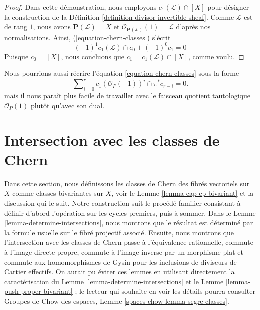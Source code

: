 \begin{proof}
Dans cette démonstration, nous employons $c_1(\mathcal{L}) \cap [X]$ pour désigner la
construction de la Définition \ref{definition-divisor-invertible-sheaf}.
Comme $\mathcal{L}$ est de rang $1$, nous avons
$\mathbf{P}(\mathcal{L}) = X$ et
$\mathcal{O}_{\mathbf{P}(\mathcal{L})}(1) = \mathcal{L}$
d'après nos normalisations. Ainsi, (\ref{equation-chern-classes})
s'écrit
$$
(-1)^1 c_1(\mathcal{L}) \cap c_0 + (-1)^0 c_1 = 0
$$
Puisque $c_0 = [X]$, nous concluons que $c_1 = c_1(\mathcal{L}) \cap [X]$,
comme voulu.
\end{proof}

\begin{remark}
\label{remark-equation-signs}
Nous pourrions aussi récrire l'équation \ref{equation-chern-classes} sous la forme
\begin{equation}
\label{equation-signs}
\sum\nolimits_{i = 0}^r
c_1(\mathcal{O}_P(-1))^i \cap \pi^*c_{r - i}
= 0.
\end{equation}
mais il nous paraît plus facile de travailler avec le faisceau quotient
tautologique $\mathcal{O}_P(1)$ plutôt qu'avec
son dual.
\end{remark}




\section{Intersection avec les classes de Chern}
\label{section-intersecting-chern-classes}

\noindent
Dans cette section, nous définissons les classes de Chern des fibrés vectoriels sur $X$ comme
classes bivariantes sur $X$, voir le Lemme \ref{lemma-cap-cp-bivariant}
et la discussion qui le suit. Notre construction suit le procédé familier
consistant à définir d'abord l'opération sur les cycles premiers, puis à
sommer. Dans le Lemme \ref{lemma-determine-intersections}, nous montrons
que le résultat est déterminé par la formule usuelle sur le fibré
projectif associé. Ensuite, nous montrons que l'intersection avec les classes de Chern
passe à l'équivalence rationnelle, commute à l'image directe propre,
commute à l'image inverse par un morphisme plat et commute aux homomorphismes de Gysin pour les
inclusions de diviseurs de Cartier effectifs. On aurait pu éviter ces lemmes
en utilisant directement la caractérisation du
Lemme \ref{lemma-determine-intersections} et le
Lemme \ref{lemma-push-proper-bivariant} ; le lecteur qui souhaite
en voir les détails pourra consulter
Groupes de Chow des espaces, Lemme \ref{spaces-chow-lemma-segre-classes}.

